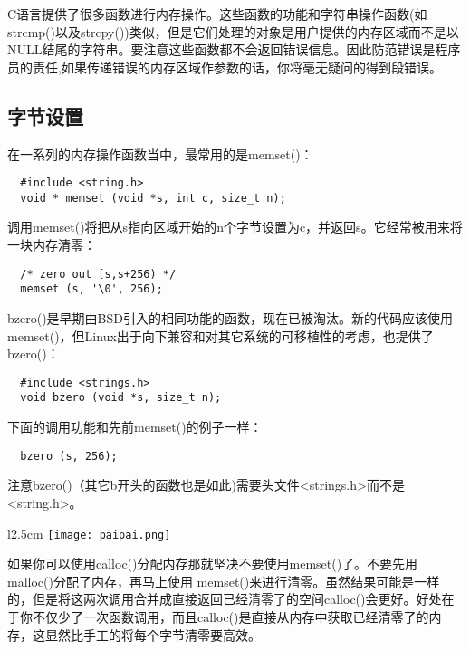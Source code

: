 C语言提供了很多函数进行内存操作。这些函数的功能和字符串操作函数(如strcmp()以及strcpy())类似，但是它们处理的对象是用户提供的内存区域而不是以NULL结尾的字符串。要注意这些函数都不会返回错误信息。因此防范错误是程序员的责任,如果传递错误的内存区域作参数的话，你将毫无疑问的得到段错误。 

\subsection{字节设置}

在一系列的内存操作函数当中，最常用的是memset()： 

\begin{lstlisting}
  #include <string.h>
  void * memset (void *s, int c, size_t n);
\end{lstlisting}

调用memset()将把从s指向区域开始的n个字节设置为c，并返回s。它经常被用来将一块内存清零： 

\begin{lstlisting}
  /* zero out [s,s+256) */
  memset (s, '\0', 256);
\end{lstlisting}

bzero()是早期由BSD引入的相同功能的函数，现在已被淘汰。新的代码应该使用memset()，但Linux出于向下兼容和对其它系统的可移植性的考虑，也提供了bzero()：

\begin{lstlisting}
  #include <strings.h>
  void bzero (void *s, size_t n);
\end{lstlisting}

下面的调用功能和先前memset()的例子一样： 

\begin{lstlisting}
  bzero (s, 256);
\end{lstlisting}

注意bzero()（其它b开头的函数也是如此)需要头文件<strings.h>而不是<string.h>。

\begin{wrapfigure}{l}{2.5cm}
  \texttt{[image: paipai.png]}
\end{wrapfigure}
\mbox{}\begin{flushleft}如果你可以使用calloc()分配内存那就坚决不要使用memset()了。不要先用malloc()分配了内存，再马上使用 memset()来进行清零。虽然结果可能是一样的，但是将这两次调用合并成直接返回已经清零了的空间calloc()会更好。好处在于你不仅少了一次函数调用，而且calloc()是直接从内存中获取已经清零了的内存，这显然比手工的将每个字节清零要高效。\end{flushleft}

